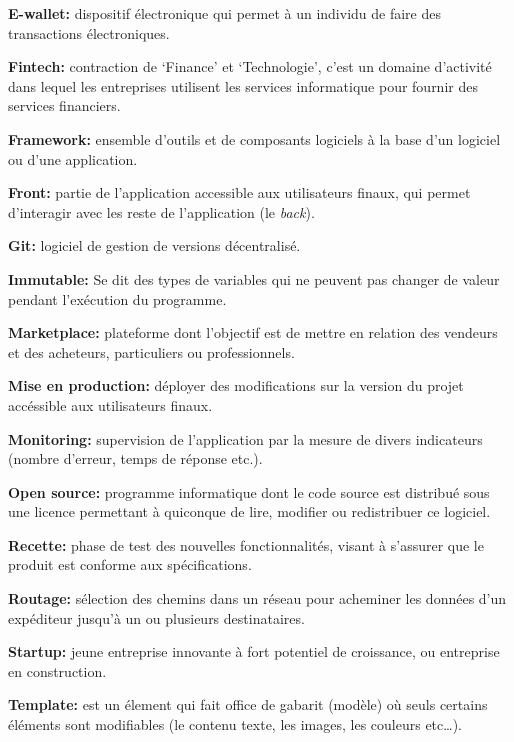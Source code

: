 \textbf{E-wallet:} dispositif électronique qui permet à un individu de
faire des transactions électroniques.

\bigskip

\textbf{Fintech:} contraction de `Finance' et `Technologie', c'est un
domaine d'activité dans lequel les entreprises utilisent les services
informatique pour fournir des services financiers.

\bigskip

\textbf{Framework:} ensemble d'outils et de composants logiciels à la
base d'un logiciel ou d'une application.

\bigskip

\textbf{Front:} partie de l'application accessible aux utilisateurs
finaux, qui permet d'interagir avec les reste de l'application (le
\emph{back}).

\bigskip

\textbf{Git:} logiciel de gestion de versions décentralisé.

\bigskip

\textbf{Immutable:} Se dit des types de variables qui ne peuvent pas
changer de valeur pendant l'exécution du programme.

\bigskip

\textbf{Marketplace:} plateforme dont l'objectif est de mettre en
relation des vendeurs et des acheteurs, particuliers ou professionnels.

\bigskip

\textbf{Mise en production:} déployer des modifications sur la version
du projet accéssible aux utilisateurs finaux.

\bigskip

\textbf{Monitoring:} supervision de l'application par la mesure de
divers indicateurs (nombre d'erreur, temps de réponse etc.).

\bigskip

\textbf{Open source:} programme informatique dont le code source est
distribué sous une licence permettant à quiconque de lire, modifier ou
redistribuer ce logiciel.

\bigskip

\textbf{Recette:} phase de test des nouvelles fonctionnalités, visant à
s'assurer que le produit est conforme aux spécifications.

\bigskip

\textbf{Routage:} sélection des chemins dans un réseau pour acheminer
les données d'un expéditeur jusqu'à un ou plusieurs destinataires.

\bigskip

\textbf{Startup:} jeune entreprise innovante à fort potentiel de
croissance, ou entreprise en construction.

\bigskip

\textbf{Template:} est un élement qui fait office de gabarit (modèle) où
seuls certains éléments sont modifiables (le contenu texte, les images,
les couleurs etc\ldots{}).
